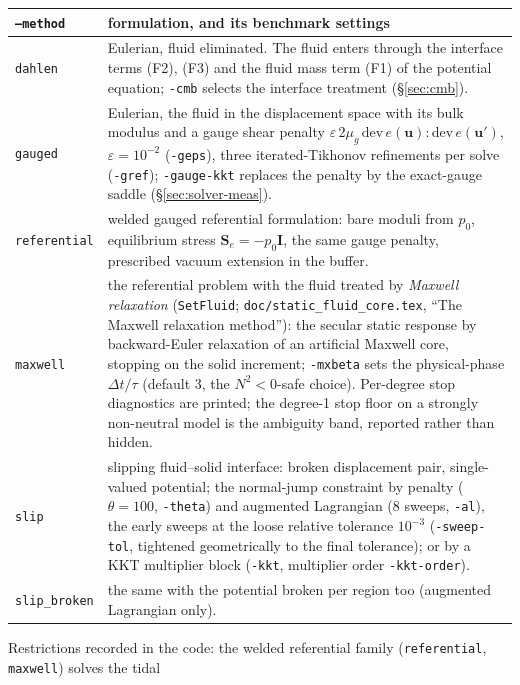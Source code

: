 \documentclass[11pt]{article}
\numberwithin{equation}{section}
\newcommand{\eps}{\varepsilon}
\newcommand{\vu}{\mathbf{u}}
\newcommand{\code}[1]{\texttt{#1}}
\begin{document}
\begin{center}
\small
\begin{tabular}{@{}lP{11.5cm}@{}}
\toprule
\code{--method} & formulation, and its benchmark settings \\
\midrule
\code{dahlen} & Eulerian, fluid eliminated. The fluid enters through the interface terms (F2), (F3) and the fluid mass term (F1) of the potential equation; \code{-cmb} selects the interface treatment (\S\ref{sec:cmb}). \\
\code{gauged} & Eulerian, the fluid in the displacement space with its bulk modulus and a gauge shear penalty $\eps\,2\mu_g\,\mathrm{dev}\,e(\vu):\mathrm{dev}\,e(\vu')$, $\eps=10^{-2}$ (\code{-geps}), three iterated-Tikhonov refinements per solve (\code{-gref}); \code{-gauge-kkt} replaces the penalty by the exact-gauge saddle (\S\ref{sec:solver-meas}). \\
\code{referential} & welded gauged referential formulation: bare moduli from $p_0$, equilibrium stress $\mathbf{S}_e=-p_0\mathbf{I}$, the same gauge penalty, prescribed vacuum extension in the buffer. \\
\code{maxwell} & the referential problem with the fluid treated by \emph{Maxwell relaxation} (\code{SetFluid}; \code{doc/static\_fluid\_core.tex}, ``The Maxwell relaxation method''): the secular static response by backward-Euler relaxation of an artificial Maxwell core, stopping on the solid increment; \code{-mxbeta} sets the physical-phase $\Delta t/\tau$ (default 3, the $N^2<0$-safe choice). Per-degree stop diagnostics are printed; the degree-1 stop floor on a strongly non-neutral model is the ambiguity band, reported rather than hidden. \\
\code{slip} & slipping fluid--solid interface: broken displacement pair, single-valued potential; the normal-jump constraint by penalty ($\theta=100$, \code{-theta}) and augmented Lagrangian (8 sweeps, \code{-al}), the early sweeps at the loose relative tolerance $10^{-3}$ (\code{-sweep-tol}, tightened geometrically to the final tolerance); or by a KKT multiplier block (\code{-kkt}, multiplier order \code{-kkt-order}). \\
\code{slip\_broken} & the same with the potential broken per region too (augmented Lagrangian only). \\
\bottomrule
\end{tabular}
\end{center}
\noindent Restrictions recorded in the code: the welded referential
family (\code{referential}, \code{maxwell}) solves the tidal
\end{document}
